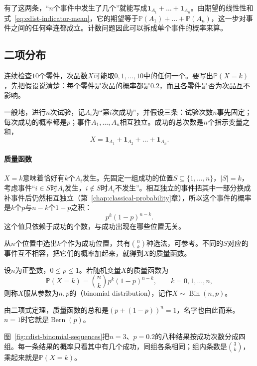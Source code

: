 有了这两条，“$n$个事件中发生了几个”就能写成$\mathbf{1}_{A_1}+\dots+\mathbf{1}_{A_n}$。由期望的线性性和式~\eqref{eq:cdist-indicator-mean}，它的期望等于$\mathbb{P}(A_1)+\dots+\mathbb{P}(A_n)$，这一步对事件之间的任何牵连都成立。计数问题因此可以拆成单个事件的概率来算。

\subsection{二项分布}
\label{sec:cdist-binomial}

连续检查$10$个零件，次品数$X$可能取$0,1,\dots,10$中的任何一个。要写出$\mathbb{P}(X=k)$，先把假设说清楚：每个零件是次品的概率都是$0.2$，而且各零件是否为次品互不影响。

一般地，进行$n$次试验，记$A_i$为“第$i$次成功”，并假设三条：试验次数$n$事先固定；每次成功的概率都是$p$；事件$A_1,\dots,A_n$相互独立。成功的总次数是$n$个指示变量之和，
\[
  X=\mathbf{1}_{A_1}+\mathbf{1}_{A_2}+\dots+\mathbf{1}_{A_n}.
\]

\paragraph{质量函数}
$X=k$意味着恰好有$k$个$A_i$发生。先固定一组成功的位置$S\subseteq\{1,\dots,n\}$，$\lvert S\rvert=k$，考虑事件“$i\in S$时$A_i$发生，$i\notin S$时$A_i$不发生”。相互独立的事件把其中一部分换成补事件后仍然相互独立（第~\ref{chap:classical-probability}章），所以这个事件的概率是$k$个$p$与$n-k$个$1-p$之积：
\[
  p^{k}(1-p)^{n-k}.
\]
这个值只依赖于成功的个数，与成功出现在哪些位置无关。

从$n$个位置中选出$k$个作为成功位置，共有$\binom{n}{k}$种选法，可参考。不同的$S$对应的事件互不相容，把它们的概率加起来，就得到$X$的质量函数。

\begin{definition}[二项分布]
\label{def:cdist-binomial}
设$n$为正整数，$0\leq p\leq1$。若随机变量$X$的质量函数为
\begin{equation}
  \mathbb{P}(X=k)=\binom{n}{k}p^{k}(1-p)^{n-k},\qquad k=0,1,\dots,n,
  \label{eq:cdist-binomial-pmf}
\end{equation}
则称$X$服从参数为$n,p$的（binomial distribution），记作$X\sim\operatorname{Bin}(n,p)$。
\end{definition}

由二项式定理，质量函数的总和是$(p+(1-p))^{n}=1$，名字也由此而来。$n=1$时它就是$\operatorname{Bern}(p)$。

图~\ref{fig:cdist-binomial-sequences}把$n=3$、$p=0.2$的八种结果按成功次数分成四组。每一条结果的概率只看其中有几个成功，同组各条相同；组内条数是$\binom{3}{k}$，乘起来就是$\mathbb{P}(X=k)$。

